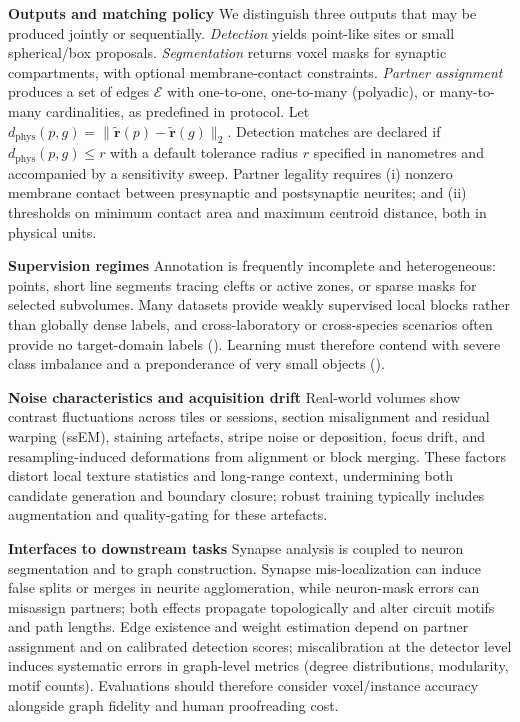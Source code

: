 \medskip
\noindent\textbf{Outputs and matching policy}\;
We distinguish three outputs that may be produced jointly or sequentially.
\emph{Detection} yields point-like sites or small spherical/box proposals.
\emph{Segmentation} returns voxel masks for synaptic compartments, with optional membrane-contact constraints.
\emph{Partner assignment} produces a set of edges \(\mathcal E\) with one-to-one, one-to-many (polyadic), or many-to-many cardinalities, as predefined in protocol.
Let \( d_{\mathrm{phys}}(p,g)=\|\tilde{\mathbf r}(p)-\tilde{\mathbf r}(g)\|_2 \).
Detection matches are declared if \(d_{\mathrm{phys}}(p,g)\le r\) with a default tolerance radius \(r\) specified in nanometres and accompanied by a sensitivity sweep.
Partner legality requires (i) nonzero membrane contact between presynaptic and postsynaptic neurites; and (ii) thresholds on minimum contact area and maximum centroid distance, both in physical units.\par

\medskip
\noindent\textbf{Supervision regimes}\;
Annotation is frequently incomplete and heterogeneous: points, short line segments tracing clefts or active zones, or sparse masks for selected subvolumes.
Many datasets provide weakly supervised local blocks rather than globally dense labels, and cross-laboratory or cross-species scenarios often provide no target-domain labels (\cite{Park2022Cerebellar}).
Learning must therefore contend with severe class imbalance and a preponderance of very small objects (\cite{Svara2022Zebrafish}).\par

\medskip
\noindent\textbf{Noise characteristics and acquisition drift}\;
Real-world volumes show contrast fluctuations across tiles or sessions, section misalignment and residual warping (ssEM), staining artefacts, stripe noise or deposition, focus drift, and resampling-induced deformations from alignment or block merging.
These factors distort local texture statistics and long-range context, undermining both candidate generation and boundary closure; robust training typically includes augmentation and quality-gating for these artefacts.\par

\medskip
\noindent\textbf{Interfaces to downstream tasks}\;
Synapse analysis is coupled to neuron segmentation and to graph construction.
Synapse mis-localization can induce false splits or merges in neurite agglomeration, while neuron-mask errors can misassign partners; both effects propagate topologically and alter circuit motifs and path lengths.
Edge existence and weight estimation depend on partner assignment and on calibrated detection scores; miscalibration at the detector level induces systematic errors in graph-level metrics (degree distributions, modularity, motif counts).
Evaluations should therefore consider voxel/instance accuracy alongside graph fidelity and human proofreading cost.\par

